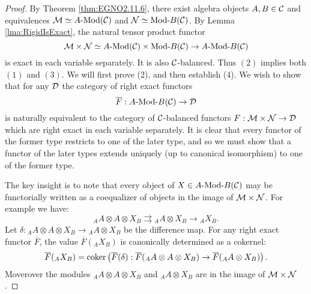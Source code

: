 \documentclass{amsart}
\begin{document}

\begin{proof}
	 By Theorem \ref{thm:EGNO2.11.6}, there exist algebra objects $A, B \in \mathcal C$ and equivalences $\cM \simeq \Mod{A}{}(\cC)$ and $\cN \simeq \Mod{}{B}(\cC)$. By Lemma \ref{lma:RigidIsExact}, the natural tensor product functor
	\begin{equation*}
		\cM \times \cN \simeq \Mod{A}{}(\cC) \times  \Mod{}{B}(\cC) \to \Mod{A}{B}(\cC)
	\end{equation*}
	is exact in each variable separately. It is also $\mathcal C$-balanced. Thus $(2)$ implies both  $(1)$ and $(3)$. We will first prove (2), and then establish (4).  We wish to show that for any $\mathcal D$ the category of right exact functors 
\begin{equation*}
	\overline{F}:\Mod{A}{B}(\cC) \to \cD
\end{equation*}
	is naturally equivalent to the category of $\mathcal C$-balanced functors $F:\mathcal M \times \mathcal N \to \mathcal D$ which are right exact in each variable separately. It is clear that every functor of the former type restricts to one of the later type, and so we must show that a functor of the later types extends uniquely (up to canonical isomorphism) to one of the former type. 
	
The key insight is to note that every object of $X \in \Mod{A}{B}(\cC)$ may be functorially written as a coequalizer of objects in the image of $\mathcal M \times \mathcal N$. For example we have:
\begin{equation*}
	{}_A A \otimes A \otimes X_B \rightrightarrows {}_A A \otimes X_B \to {}_A X_B.
\end{equation*}
Let $\delta: {}_A A \otimes A \otimes X_B \to {}_A A \otimes X_B$ be the difference map. 
For any right exact functor $\overline{F}$, the value $\overline{F}({}_A X_B)$ is canonically determined as a cokernel:
\begin{equation*}
	\overline{F}({}_A X_B) = \operatorname*{coker} \left( \overline{F}(\delta): \overline{F}({}_A A \otimes A \otimes X_B) \to \overline{F}({}_A A \otimes X_B) \right).
\end{equation*} 
Moverover the modules ${}_A A \otimes A \otimes X_B$ and ${}_A A \otimes X_B$ are in the image of $\mathcal M \times \mathcal N$. 
	

\end{proof}
\end{document}
